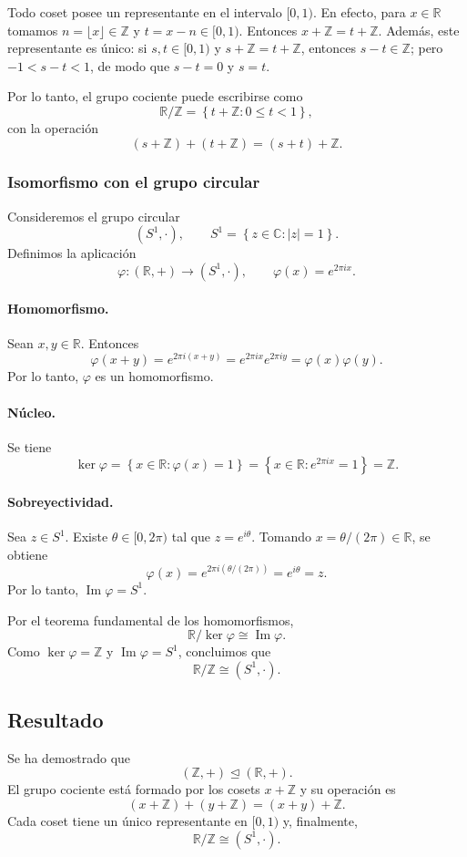 \documentclass[11pt,a4paper]{article}
\newcommand{\R}{\mathbb{R}}
\newcommand{\Z}{\mathbb{Z}}
\newcommand{\set}[1]{\left\{#1\right\}}
\begin{document}
Todo coset posee un representante en el intervalo $[0,1)$. En efecto, para $x\in\R$ tomamos $n=\lfloor x\rfloor\in\Z$ y $t=x-n\in[0,1)$. Entonces $x+\Z=t+\Z$. Además, este representante es único: si $s,t\in[0,1)$ y $s+\Z=t+\Z$, entonces $s-t\in\Z$; pero $-1<s-t<1$, de modo que $s-t=0$ y $s=t$.

Por lo tanto, el grupo cociente puede escribirse como
\[
\R/\Z=\set{t+\Z:0\leq t<1},
\]
con la operación
\[
(s+\Z)+(t+\Z)=(s+t)+\Z.
\]

\subsubsection*{Isomorfismo con el grupo circular}

Consideremos el grupo circular
\[
(S^1,\cdot),\qquad S^1=\set{z\in\mathbb{C}:|z|=1}.
\]
Definimos la aplicación
\[
\varphi:(\R,+)\longrightarrow(S^1,\cdot),\qquad \varphi(x)=e^{2\pi i x}.
\]

\paragraph{Homomorfismo.} Sean $x,y\in\R$. Entonces
\[
\varphi(x+y)=e^{2\pi i(x+y)}=e^{2\pi i x}e^{2\pi i y}=\varphi(x)\varphi(y).
\]
Por lo tanto, $\varphi$ es un homomorfismo.

\paragraph{Núcleo.} Se tiene
\[
\ker\varphi=\set{x\in\R:\varphi(x)=1}
=\set{x\in\R:e^{2\pi i x}=1}=\Z.
\]

\paragraph{Sobreyectividad.} Sea $z\in S^1$. Existe $\theta\in[0,2\pi)$ tal que $z=e^{i\theta}$. Tomando $x=\theta/(2\pi)\in\R$, se obtiene
\[
\varphi(x)=e^{2\pi i(\theta/(2\pi))}=e^{i\theta}=z.
\]
Por lo tanto, $\operatorname{Im}\varphi=S^1$.

Por el teorema fundamental de los homomorfismos,
\[
\R/\ker\varphi\cong\operatorname{Im}\varphi.
\]
Como $\ker\varphi=\Z$ y $\operatorname{Im}\varphi=S^1$, concluimos que
\[
\R/\Z\cong(S^1,\cdot).
\]

\subsection*{Resultado}

Se ha demostrado que
\[
(\Z,+)\trianglelefteq(\R,+).
\]
El grupo cociente está formado por los cosets $x+\Z$ y su operación es
\[
(x+\Z)+(y+\Z)=(x+y)+\Z.
\]
Cada coset tiene un único representante en $[0,1)$ y, finalmente,
\[
\R/\Z\cong(S^1,\cdot).
\]
\end{document}
